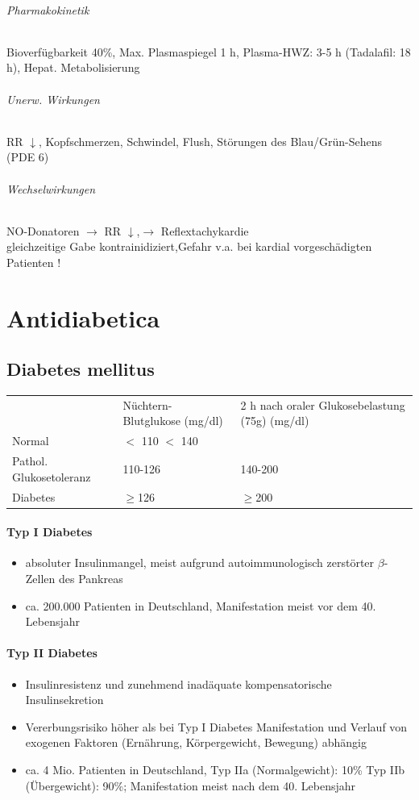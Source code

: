 \documentclass[10pt,a4paper]{report}
\begin{document}
\subparagraph{Pharmakokinetik} Bioverfügbarkeit 40\%, Max. Plasmaspiegel 1 h, Plasma-HWZ: 3-5 h (Tadalafil: 18 h), Hepat. Metabolisierung

\subparagraph{Unerw. Wirkungen} RR $\downarrow$, Kopfschmerzen, Schwindel, Flush, Störungen des Blau/Grün-Sehens (PDE 6)

\subparagraph{Wechselwirkungen}
NO-Donatoren $\rightarrow$ RR $\downarrow$,$\rightarrow$ Reflextachykardie\\
gleichzeitige Gabe kontrainidiziert,Gefahr v.a. bei kardial vorgeschädigten Patienten !
\chapter{Antidiabetica} %
\label{cha:antidiabetica}
\section{Diabetes mellitus} %
\label{sec:diabetes_mellitus}

\begin{tabularx}{\textwidth}{XXX}
&Nüchtern-Blutglukose (mg/dl) &2 h nach oraler Glukosebelastung (75g) (mg/dl)\\
Normal& $<$ 110 $<$ 140\\
Pathol. Glukosetoleranz&110-126&140-200\\
Diabetes&$\geq$126&$\geq$200\\
\end{tabularx}
\subsubsection{Typ I Diabetes} %
\label{ssub:typ_i_diabetes}
\begin{itemize}
	\item absoluter Insulinmangel, meist aufgrund autoimmunologisch zerstörter $\beta$-Zellen des Pankreas 
	\item ca. 200.000 Patienten in Deutschland, Manifestation meist vor dem 40. 	Lebensjahr
\end{itemize}
\subsubsection{Typ II Diabetes} %
\label{ssub:typ_ii_diabetes}
\begin{itemize}
	\item Insulinresistenz und zunehmend inadäquate kompensatorische Insulinsekretion
	\item Vererbungsrisiko höher als bei Typ I Diabetes Manifestation und Verlauf von exogenen Faktoren (Ernährung, Körpergewicht, Bewegung) abhängig
	\item ca. 4 Mio. Patienten in Deutschland, Typ IIa (Normalgewicht): 10\% Typ IIb (Übergewicht): 90\%; Manifestation meist nach dem 40. Lebensjahr
\end{itemize}
\end{document}
